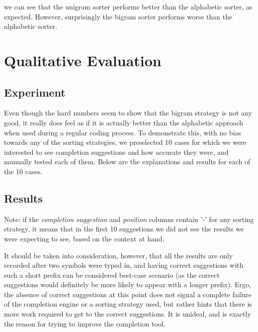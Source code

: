  we can see that  the unigram sorter performs  better than the alphabetic sorter, as expected.  However, surprisingly the bigram sorter  performs  worse than the alphabetic sorter.    

\section{Qualitative Evaluation}
\label{sec:Evaluation-Qualitative}
\subsection{Experiment}
Even though the hard numbers seem to show that the bigram strategy is not any good, it really does feel as if it is actually better than the alphabetic approach when used during a regular coding process. To demonstrate this, with no bias towards any of the sorting strategies, we preselected 10 cases for which we were interested to see completion suggestions and how accurate they were, and manually tested each of them. Below are the explanations and results for each of the 10 cases.

\subsection{Results}
Note: if the \textit{completion suggestion} and \textit{position} columns contain '-' for any sorting strategy, it means that in the first 10 suggestions we did not see the results we were expecting to see, based on the context at hand.

It should be taken into consideration, however, that all the results are only recorded after two symbols were typed in, and having correct suggestions with such a short prefix can be considered best-case scenario (as the correct suggestions would definitely be more likely to appear with a longer prefix). Ergo, the absence of correct suggestions at this point does not signal a complete failure of the completion engine or a sorting strategy used, but rather hints that there is more work required to get to the correct suggestions. It is unideal, and is exactly the reason for trying to improve the completion tool.

